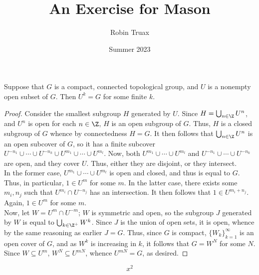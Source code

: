 \documentclass[12pt]{article}
\title{An Exercise for Mason}
\author{Robin Truax}
\date{Summer 2023}
\begin{document}
\maketitle

\begin{proposition}[Exercise 1]\label{prop:Exercise_1}
    Suppose that $G$ is a compact, connected topological group, and $U$ is a nonempty open subset of $G$. Then $U^k = G$ for some finite $k$.
\end{proposition}
\begin{proof}
    Consider the smallest subgroup $H$ generated by $U$. Since $H = \bigcup_{n \in \Z}U^n$, and $U^n$ is open for each $n \in \Z$, $H$ is an open subgroup of $G$. Thus, $H$ is a closed subgroup of $G$ whence by connectedness $H = G$. It then follows that $\bigcup_{n \in \Z}U^n$ is an open subcover of $G$, so it has a finite subcover $U^{-n_1} \cup \cdots \cup U^{-n_k} \cup U^{m_1} \cup \cdots \cup U^{m_l}$. Now, both $U^{m_1} \cup \cdots \cup U^{m_l}$ and $U^{-n_1} \cup \cdots \cup U^{-n_k}$ are open, and they cover $U$. Thus, either they are disjoint, or they intersect.\\

    In the former case, $U^{m_1} \cup \cdots \cup U^{m_l}$ is open and closed, and thus is equal to $G$. Thus, in particular, $1 \in U^m$ for some $m$. In the latter case, there exists some $m_i,n_j$ such that $U^{m_i} \cap U^{-n_j}$ has an intersection. It then follows that $1 \in U^{m_i + n_j}$. Again, $1 \in U^m$ for some $m$.\\

    Now, let $W = U^m \cap U^{-m}$; $W$ is symmetric and open, so the subgroup $J$ generated by $W$ is equal to $\bigcup_{k \in \Z^+} W^k$. Since $J$ is the union of open sets, it is open, whence by the same reasoning as earlier $J = G$. Thus, since $G$ is compact, $\{W_k\}_{k=1}^{\infty}$ is an open cover of $G$, and as $W^k$ is increasing in $k$, it follows that $G = W^N$ for some $N$. Since $W \subseteq U^m$, $W^N \subseteq U^{mN}$, whence $U^{mN} = G$, as desired.
\end{proof}
\begin{equation*}
    x^2
\end{equation*}
\end{document}
